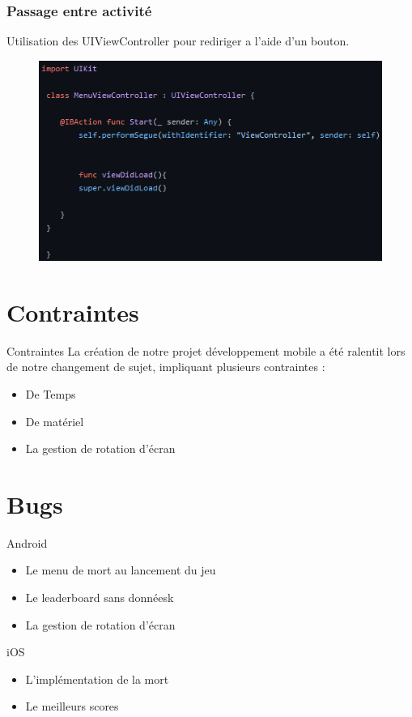 \documentclass{beamer}
\begin{document}
\begin{frame}
  \frametitle{Passage entre activité}
  Utilisation des UIViewController pour rediriger a l'aide d'un bouton.
  \begin{figure}
        \centering
        \includegraphics[scale=0.5]{MenuViewController.png}
    \end{figure}
\end{frame}
%
%
\section{Contraintes}
%
%
\begin{frame}{Contraintes}
La création de notre projet développement mobile a été ralentit lors de notre changement de sujet, impliquant plusieurs contraintes : 
\begin{itemize}
    \item De Temps
    \item De matériel
    \item La gestion de rotation d'écran
             \end{itemize}
\end{frame}
  
%
%
\section{Bugs}
%
%

\begin{frame}{Android}
  \begin{itemize}
    \item Le menu de mort au lancement du jeu
    \item Le leaderboard sans donnéesk
    \item La gestion de rotation d'écran
  \end{itemize}
\end{frame}
%
\begin{frame}{iOS}
  \begin{itemize}
    \item L'implémentation de la mort
    \item Le meilleurs scores
  \end{itemize}
\end{frame}
%
%
\end{document}
